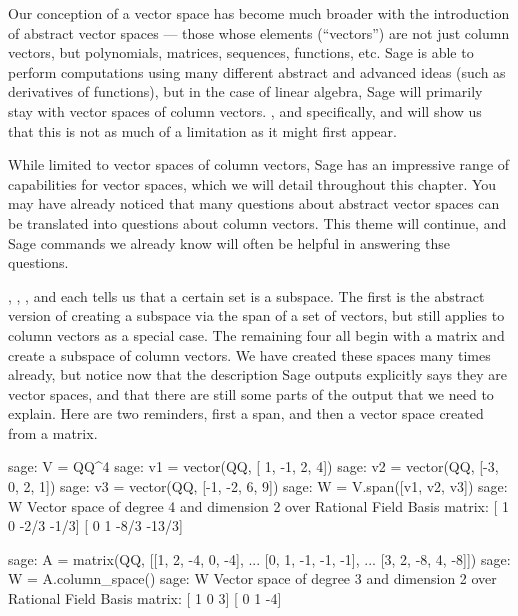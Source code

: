 Our conception of a vector space has become much broader with the introduction of abstract vector spaces --- those whose elements (``vectors'') are not just column vectors, but polynomials, matrices, sequences, functions, etc.  Sage is able to perform computations using many different abstract and advanced ideas (such as derivatives of functions), but in the case of linear algebra, Sage will primarily stay with vector spaces of column vectors.  , and specifically,  and  will show us that this is not as much of a limitation as it might first appear.\par
%
While limited to vector spaces of column vectors, Sage has an impressive range of capabilities for vector spaces, which we will detail throughout this chapter.  You may have already noticed that many questions about abstract vector spaces can be translated into questions about column vectors.  This theme will continue, and Sage commands we already know will often be helpful in answering thse questions.\par
%
, , ,  and   each tells us that a certain set is a subspace.  The first is the abstract version of creating a subspace via the span of a set of vectors, but still applies to column vectors as a special case.  The remaining four all begin with a matrix and create a subspace of column vectors.  We have created these spaces many times already, but notice now that the description Sage outputs explicitly says they are vector spaces, and that there are still some parts of the output that we need to explain.  Here are two reminders, first a span, and then a vector space created from a matrix.
%
\begin{sageexample}
sage: V = QQ^4
sage: v1 = vector(QQ, [ 1, -1, 2, 4])
sage: v2 = vector(QQ, [-3,  0, 2, 1])
sage: v3 = vector(QQ, [-1, -2, 6, 9])
sage: W = V.span([v1, v2, v3])
sage: W
Vector space of degree 4 and dimension 2 over Rational Field
Basis matrix:
[    1     0  -2/3  -1/3]
[    0     1  -8/3 -13/3]
\end{sageexample}
%
\begin{sageexample}
sage: A = matrix(QQ, [[1, 2, -4,  0, -4],
...                   [0, 1, -1, -1, -1],
...                   [3, 2, -8,  4, -8]])
sage: W = A.column_space()
sage: W
Vector space of degree 3 and dimension 2 over Rational Field
Basis matrix:
[ 1  0  3]
[ 0  1 -4]
\end{sageexample}
%
\begin{sageverbatim}
\end{sageverbatim}
%
